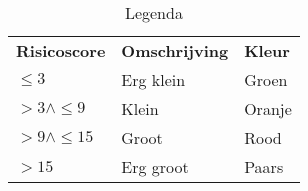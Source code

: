 \documentclass[dutch]{article}
\begin{document}
\begin{table}[!h]
    \begin{tabular}{lll}
        \textbf{Risicoscore} & \textbf{Omschrijving} & \textbf{Kleur} \\
        $\le3$               & Erg klein             & Groen          \\
        $>3\land\le9$        & Klein                 & Oranje         \\
        $>9\land\le15$       & Groot                 & Rood           \\
        $>15$                & Erg groot             & Paars
    \end{tabular}
    \caption{\label{tab:risks-legend}Legenda}
\end{table}
\end{document}
